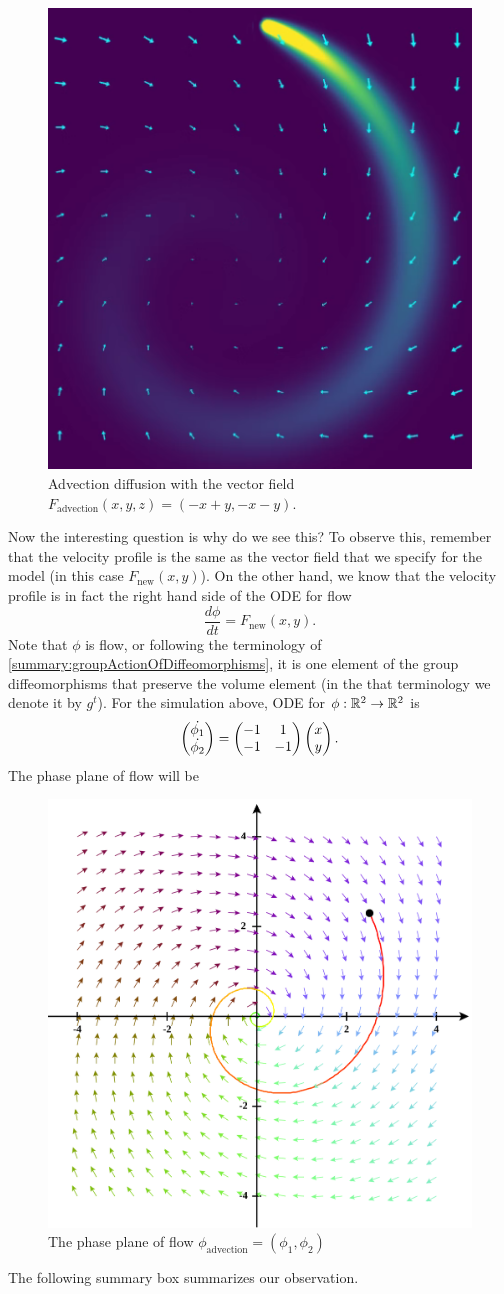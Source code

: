 \begin{figure}[h!]
	\centering
	\includegraphics[width=0.5\linewidth]{images/spiralAdvectionDiffusion.png}
	\caption{Advection diffusion with the vector field $ F_{\text{advection}}(x,y,z) = (-x+y, -x-y)$.}
	\label{fig:spiralAdvectionDiffusion}
\end{figure}
\FloatBarrier

Now the interesting question is why do we see this? To observe this, remember that the velocity profile is the same as the vector field that we specify for the model (in this case $ F_\text{new}(x,y) $). On the other hand, we know that the velocity profile is in fact the right hand side of the ODE for flow
\[ \frac{d \phi}{d t} = F_\text{new}(x,y). \]
Note that $ \phi $ is flow, or following the terminology of \autoref{summary:groupActionOfDiffeomorphisms}, it is one element of the group diffeomorphisms that preserve the volume element (in the that terminology we denote it by $ g^t $). For the simulation above, ODE for $ \phi:\mathbb{R}^2 \to \mathbb{R}^2 $ is 
\[ \begin{pmatrix} \dot{\phi_1} \\ \dot{\phi_2} \end{pmatrix} = \begin{pmatrix} -1 & 1 \\ -1 & -1 \end{pmatrix}\begin{pmatrix} x \\ y \end{pmatrix}. \]
The phase plane of flow will be

\begin{figure}[h!]
	\centering
	\includegraphics[width=0.2\linewidth]{images/flowLinePlot.png}
	\caption{The phase plane of flow $ \phi_\text{advection} = (\phi_1,\phi_2) $}
	\label{fig:SpiralAdvectionDiffusionFlowPhasePortrait}
\end{figure}
\FloatBarrier
 
The following summary box summarizes our observation.
 
